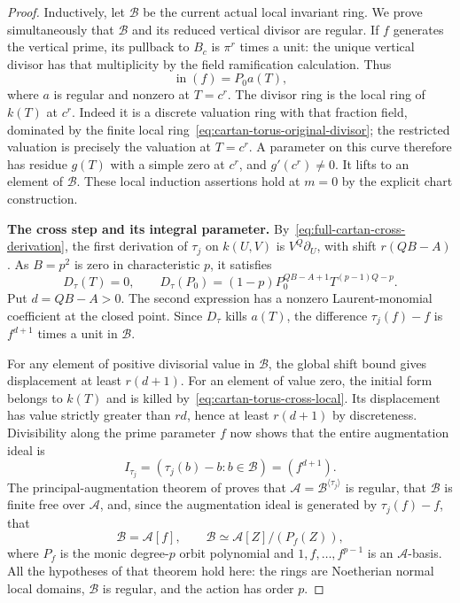 \begin{proof}
Inductively, let $\mathcal B$ be the current actual local invariant ring. We prove simultaneously that $\mathcal B$ and its reduced vertical divisor are regular. If $f$ generates the vertical prime, its pullback to $B_c$ is $\pi^r$ times a unit: the unique vertical divisor has that multiplicity by the field ramification calculation. Thus
\[
 \operatorname{in}(f)=P_0 a(T),
\]
where $a$ is regular and nonzero at $T=c^r$. The divisor ring is the local ring of $k(T)$ at $c^r$. Indeed it is a discrete valuation ring with that fraction field, dominated by the finite local ring~\eqref{eq:cartan-torus-original-divisor}; the restricted valuation is precisely the valuation at $T=c^r$. A parameter on this curve therefore has residue $g(T)$ with a simple zero at $c^r$, and $g'(c^r)\ne0$. It lifts to an element of $\mathcal B$. These local induction assertions hold at $m=0$ by the explicit chart construction.

\par\medskip\noindent\textbf{The cross step and its integral parameter.}\enspace
By~\eqref{eq:full-cartan-cross-derivation}, the first derivation of $\tau_j$ on $k(U,V)$ is $V^Q\partial_U$, with shift $r(QB-A)$. As $B=p^2$ is zero in characteristic $p$, it satisfies
\begin{equation}\label{eq:cartan-torus-cross-local}
 D_\tau(T)=0,\qquad
 D_\tau(P_0)=(1-p)P_0^{QB-A+1}T^{(p-1)Q-p}.
\end{equation}
Put $d=QB-A>0$. The second expression has a nonzero Laurent-monomial coefficient at the closed point. Since $D_\tau$ kills $a(T)$, the difference $\tau_j(f)-f$ is $f^{d+1}$ times a unit in $\mathcal B$.

For any element of positive divisorial value in $\mathcal B$, the global shift bound gives displacement at least $r(d+1)$. For an element of value zero, the initial form belongs to $k(T)$ and is killed by~\eqref{eq:cartan-torus-cross-local}. Its displacement has value strictly greater than $rd$, hence at least $r(d+1)$ by discreteness. Divisibility along the prime parameter $f$ now shows that the entire augmentation ideal is
\[
 I_{\tau_j}=(\tau_j(b)-b:b\in\mathcal B)=(f^{d+1}).
\]
The principal-augmentation theorem of \citet[Theorem~2 and Proposition~5, pp.~64--69]{KiralyLutkebohmert2013} proves that $\mathcal A=\mathcal B^{\langle\tau_j\rangle}$ is regular, that $\mathcal B$ is finite free over $\mathcal A$, and, since the augmentation ideal is generated by $\tau_j(f)-f$, that
\[
 \mathcal B=\mathcal A[f],\qquad \mathcal B\simeq\mathcal A[Z]/(P_f(Z)),
\]
where $P_f$ is the monic degree-$p$ orbit polynomial and $1,f,\ldots,f^{p-1}$ is an $\mathcal A$-basis. All the hypotheses of that theorem hold here: the rings are Noetherian normal local domains, $\mathcal B$ is regular, and the action has order $p$.


\end{proof}

